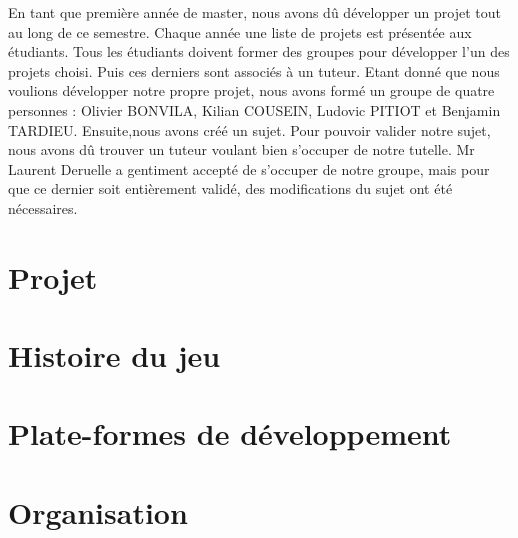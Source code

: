 En tant que première année de master, nous avons dû développer un projet tout au long de ce semestre. Chaque année une liste de projets est présentée aux étudiants. Tous les étudiants doivent former des groupes pour développer l'un des projets choisi. Puis ces derniers sont associés à un tuteur. Etant donné que nous voulions développer notre propre projet, nous avons formé un groupe de quatre personnes : Olivier BONVILA, Kilian COUSEIN, Ludovic PITIOT et Benjamin TARDIEU. Ensuite,nous avons créé un sujet. Pour pouvoir valider notre sujet, nous avons dû trouver un tuteur voulant bien s'occuper de notre tutelle. Mr Laurent Deruelle a gentiment accepté de s'occuper de notre groupe, mais pour que ce dernier soit entièrement validé, des modifications du sujet ont été nécessaires.

\section{Projet}	
	
	
\section{Histoire du jeu}
	

\section{Plate-formes de développement}
	
	
\section{Organisation}
	
